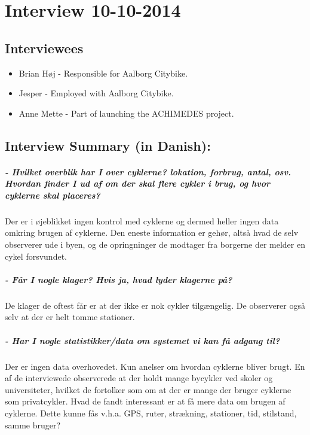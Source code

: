 \chapter{Interview 10-10-2014}\label{interviewReferat}
\section{Interviewees}
\begin{itemize}
\item Brian Høj - Responsible for Aalborg Citybike.
\item Jesper - Employed with Aalborg Citybike.
\item Anne Mette - Part of launching the ACHIMEDES project.
\end{itemize}
\section{Interview Summary (in Danish):}
\paragraph{- Hvilket overblik har I over cyklerne? lokation, forbrug, antal, osv. Hvordan finder I ud af om der skal flere cykler i brug, og hvor cyklerne skal placeres?}
Der er i øjeblikket ingen kontrol med cyklerne og dermed heller ingen  data omkring brugen
af cyklerne. Den eneste information er gehør, altså hvad de selv observerer ude i byen,
og de opringninger de modtager fra borgerne der melder en cykel forsvundet.

\paragraph{- Får I nogle klager? Hvis ja, hvad lyder klagerne på?}
De klager de oftest får er at der ikke er nok cykler tilgængelig. De observerer også selv
at der er helt tomme stationer.

\paragraph{- Har I nogle statistikker/data om systemet vi kan få adgang til?}
Der er ingen data overhovedet. Kun anelser om hvordan cyklerne bliver brugt. En af de interviewede
observerede at der holdt mange bycykler ved skoler og universiteter, hvilket de fortolker som om
at der er mange der bruger cyklerne som privatcykler.
Hvad de fandt interessant er at få mere data om brugen af cyklerne. Dette kunne fås v.h.a. GPS, ruter, strækning, stationer, tid, 
stilstand, samme bruger?

